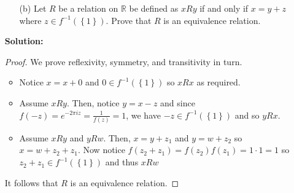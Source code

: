 \documentclass[letterpaper,12pt]{article}
\newcommand{\set}[1]{\left\{ #1 \right\}}
\theoremstyle{definition}
\begin{document}
\pagebreak
\begin{enumerate}
    \item[] \begin{enumerate}
        \item[(b)] Let $R$ be a relation on $\mathbb{R}$ be defined as $x R y$ if and only if $x = y + z$ where $z \in f^{-1}(\set{1})$. Prove that $R$ is an equivalence relation.
    \end{enumerate}
     \begin{mdframed}
            \textbf{Solution:}
            \begin{proof} We prove reflexivity, symmetry, and transitivity in turn. \begin{itemize}
                \item Notice $x = x + 0$ and $0 \in f^{-1}(\set{1})$ so $x R x$ as required.
                \item Assume $x R y$. Then, notice $y = x - z$ and since $f(-z) = e^{-2\pi i z} = \frac{1}{f(z)} = 1$, we have $-z \in f^{-1}(\set{1})$ and so $y R x$.
                \item Assume $x R y$ and $y R w$. Then, $x = y + z_1$ and $y = w + z_2$ so $x = w + z_2 + z_1$. Now notice $f(z_2+z_1) = f(z_2)f(z_1) = 1 \cdot 1 = 1$ so $z_2 + z_1 \in f^{-1}(\set{1})$ and thus $x R w$
            \end{itemize}
            It follows that $R$ is an equivalence relation. \end{proof}
        \end{mdframed}
\end{enumerate}
\pagebreak
\end{document}
